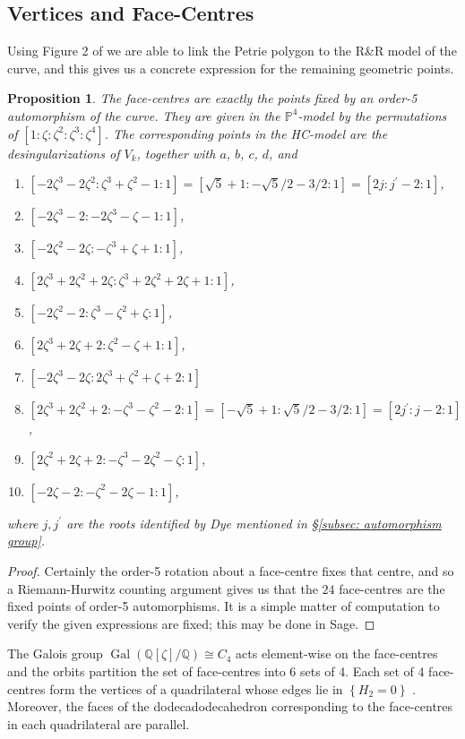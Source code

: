 \documentclass{amsart}
\newtheorem{prop}[theorem]{Proposition}
\newcommand{\pbrace}[1]{\left\{ #1 \right\} }
\begin{document}
\subsection{Vertices and Face-Centres}
Using Figure 2 of \cite{Braden2012} we are able to link the Petrie polygon to the R\&R model of the curve, and this gives us a concrete expression for the remaining geometric points. 
\begin{prop}\label{FCprop}
The face-centres are exactly the points fixed by an order-5 automorphism of the curve. They are given in the $\mathbb{P}^4$-model by the permutations of $[1:\zeta:\zeta^2:\zeta^3:\zeta^4]$. The corresponding points in the HC-model are the desingularizations of $V_k$, together with $a$, $b$, $c$, $d$, and 
\begin{enumerate}
    \item $[-2\zeta^3 - 2\zeta^2 : \zeta^3 + \zeta^2 - 1 : 1] = [\sqrt{5}+1 : -\sqrt{5}/2-3/2 : 1] = [2j : j^\prime-2: 1]$,
    \item $[-2\zeta^3 - 2 : -2\zeta^3 - \zeta - 1 : 1]$,
    \item $[-2\zeta^2 - 2\zeta : -\zeta^3 + \zeta + 1 : 1]$,
    \item $[2\zeta^3 + 2\zeta^2 + 2\zeta : \zeta^3 + 2\zeta^2 + 2\zeta + 1 : 1]$,
    \item $[-2\zeta^2 - 2 : \zeta^3 - \zeta^2 + \zeta : 1]$,
    \item $[2\zeta^3 + 2\zeta + 2 : \zeta^2 - \zeta + 1 : 1]$,
    \item $[-2\zeta^3 - 2\zeta : 2\zeta^3 + \zeta^2 + \zeta + 2 : 1]$
    \item $[2\zeta^3 + 2\zeta^2 + 2 : -\zeta^3 - \zeta^2 - 2 : 1] = [-\sqrt{5}+1 : \sqrt{5}/2-3/2:1] = [2j^\prime : j-2 : 1]$,
    \item $[2\zeta^2 + 2\zeta + 2 : -\zeta^3 - 2\zeta^2 - \zeta : 1]$,
    \item $[-2\zeta - 2 : -\zeta^2 - 2\zeta - 1 : 1]$,
\end{enumerate}
where $j, j^\prime$ are the roots identified by Dye mentioned in \S\ref{subsec: automorphism group}. 
\end{prop}
\begin{proof}
Certainly the order-5 rotation about a face-centre fixes that centre, and so a Riemann-Hurwitz counting argument gives us that the $24$ face-centres are the fixed points of order-5 automorphisms. It is a simple matter of
computation to verify the given expressions are fixed;
this may be done in Sage.
\end{proof}
The Galois group $\operatorname{Gal}(\mathbb{Q}[\zeta]/\mathbb{Q}) \cong C_4$ acts element-wise on the face-centres and the orbits partition the set of face-centres into 6 sets of 4. Each set of 4 face-centres form the vertices of a quadrilateral whose edges lie in $\pbrace{H_2=0}$ \cite{Edge1978}. Moreover, the faces of the dodecadodecahedron corresponding to the face-centres in each quadrilateral are parallel. 
\end{document}

